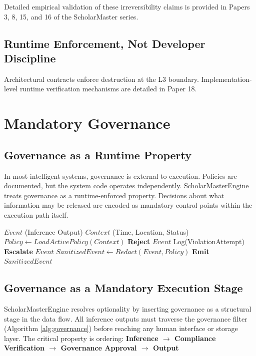 \documentclass[conference]{IEEEtran}
\begin{document}
Detailed empirical validation of these irreversibility claims is provided in Papers 3, 8, 15, and 16 of the ScholarMaster series.

\subsection{Runtime Enforcement, Not Developer Discipline}
Architectural contracts enforce destruction at the L3 boundary. Implementation-level runtime verification mechanisms are detailed in Paper 18.

\section{Mandatory Governance}

\subsection{Governance as a Runtime Property}
In most intelligent systems, governance is external to execution. Policies are documented, but the system code operates independently. ScholarMasterEngine treats governance as a runtime-enforced property. Decisions about what information may be released are encoded as mandatory control points within the execution path itself.

\begin{algorithm}
\caption{Mandatory Governance Gate Logic}
\begin{algorithmic}[1]
\REQUIRE $Event$ (Inference Output)
\REQUIRE $Context$ (Time, Location, Status)
\STATE $Policy \leftarrow LoadActivePolicy(Context)$
    \STATE \textbf{Reject} $Event$
    \STATE Log(ViolationAttempt)
    \RETURN
\ENDIF
{}
        \STATE \textbf{Escalate} $Event$
        \RETURN
    \ENDIF
\ENDIF
\STATE $SanitizedEvent \leftarrow Redact(Event, Policy)$
\STATE \textbf{Emit} $SanitizedEvent$
\end{algorithmic}
\label{alg:governance}
\end{algorithm}

\subsection{Governance as a Mandatory Execution Stage}
ScholarMasterEngine resolves optionality by inserting governance as a structural stage in the data flow. All inference outputs must traverse the governance filter (Algorithm \ref{alg:governance}) before reaching any human interface or storage layer. The critical property is ordering:
\textbf{Inference $\rightarrow$ Compliance Verification $\rightarrow$ Governance Approval $\rightarrow$ Output}
\end{document}
